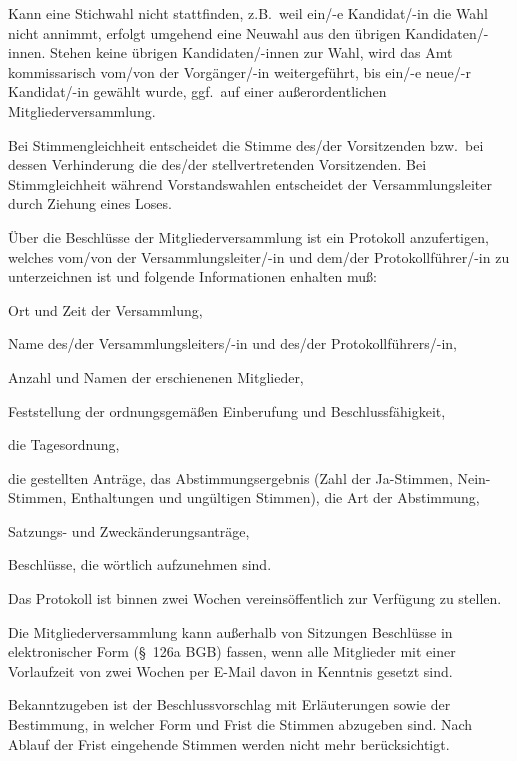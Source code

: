 \documentclass[draft]{scrartcl}
\begin{document}
\begin{contract}
Kann eine Stichwahl nicht stattfinden, z.B.\ weil ein/-e Kandidat/-in die Wahl
nicht annimmt, erfolgt umgehend eine Neuwahl aus den übri\-gen
Kandidaten/-innen. Stehen keine übri\-gen Kandidaten/-innen zur Wahl, wird das
Amt kommissarisch vom/von der Vorgänger/-in weitergeführt, bis ein/-e neue/-r
Kandidat/-in gewählt wurde, ggf.\ auf einer außerordentlichen
Mitgliederversammlung.

Bei Stimmengleichheit entscheidet die Stimme des/der Vorsitzenden bzw.\ bei
dessen Verhinderung die des/der stellvertretenden Vorsitzenden. Bei
Stimmgleichheit während Vorstandswahlen entscheidet der Versammlungsleiter
durch Ziehung eines Loses.


Über die Beschlüsse der Mitgliederversammlung ist ein Protokoll anzufertigen,
welches vom/von der Versammlungsleiter/-in und dem/der Protokollführer/-in zu
unterzeichnen ist und folgende Informationen enhalten muß:
\begin{compactenum}[\hspace{2em}1.]
  \item Ort und Zeit der Versammlung,
  \item Name des/der Versammlungsleiters/-in und des/der Protokollführers/-in,
  \item Anzahl und Namen der erschienenen Mitglieder,
  \item Feststellung der ordnungsgemäßen Einberufung und Beschlussfähigkeit,
  \item die Tagesordnung,
  \item die gestellten Anträge, das Abstimmungsergebnis (Zahl der Ja-Stimmen,
    Nein-Stimmen, Enthaltungen und ungültigen Stimmen), die Art der
    Abstimmung,
  \item Satzungs- und Zweckänderungsanträge,
  \item Beschlüsse, die wörtlich aufzunehmen sind.
\end{compactenum}

Das Protokoll ist binnen zwei Wochen vereinsöffentlich zur Verfügung zu
stellen.


Die Mitgliederversammlung kann außerhalb von Sitzungen Beschlüsse in
elektronischer Form (§~126a BGB) fassen, wenn alle Mitglieder mit einer
Vorlaufzeit von zwei Wochen per E-Mail davon in Kenntnis gesetzt
sind.\label{eBeschluss}

Bekanntzugeben ist der Beschlussvorschlag mit Erläuterungen sowie der
Bestimmung, in welcher Form und Frist die Stimmen abzugeben sind. Nach Ablauf
der Frist eingehende Stimmen werden nicht mehr berücksichtigt.


\end{contract}
\end{document}
